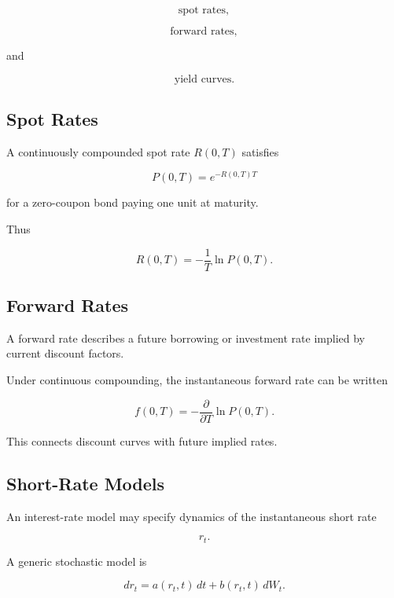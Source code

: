 \[
\boxed{
\text{spot rates},
}
\]

\[
\boxed{
\text{forward rates},
}
\]

and

\[
\boxed{
\text{yield curves}.
}
\]

\subsection{Spot Rates}
\label{subsec:spot-rates}

A continuously compounded spot rate \(R(0,T)\) satisfies

\[
\boxed{
P(0,T)
=
e^{-R(0,T)T}
}
\]

for a zero-coupon bond paying one unit at maturity.

Thus

\[
\boxed{
R(0,T)
=
-\frac1T
\ln P(0,T).
}
\]

\subsection{Forward Rates}
\label{subsec:forward-rates}

A forward rate describes a future borrowing or investment rate implied by
current discount factors.

Under continuous compounding, the instantaneous forward rate can be written

\[
\boxed{
f(0,T)
=
-
\frac{\partial}{\partial T}
\ln P(0,T).
}
\]

This connects discount curves with future implied rates.

\subsection{Short-Rate Models}
\label{subsec:short-rate-models}

An interest-rate model may specify dynamics of the instantaneous short rate

\[
\boxed{
r_t.
}
\]

A generic stochastic model is

\[
\boxed{
dr_t
=
a(r_t,t)\,dt
+
b(r_t,t)\,dW_t.
}
\]

